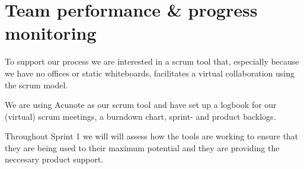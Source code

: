 \documentclass[a4paper,11pt]{article}
\begin{document}


\section{Team performance \& progress monitoring} %
\label{sec:team_performance_progress_monitoring}
To support our process we are interested in a scrum tool that, especially because we have no offices or static whiteboards, facilitates a virtual collaboration using the scrum model.

We are using Acunote as our scrum tool and have set up a logbook for our (virtual) scrum meetings, a burndown chart, sprint- and product backlogs.

Throughout Sprint 1 we will will assess how the tools are working to ensure that they are being used to their maximum potential and they are providing the neccesary product support.


\end{document}
